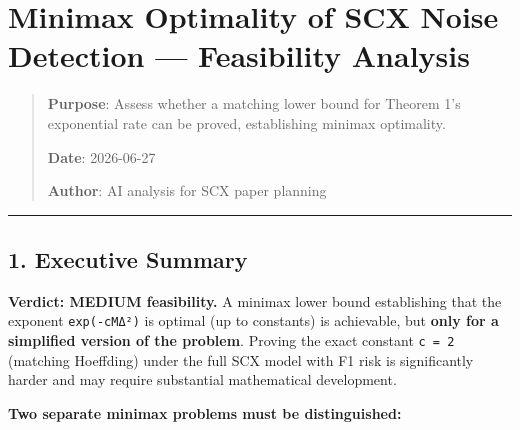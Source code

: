 \documentclass[
  12pt,
]{article}
\author{SCX}
\date{2026}
\begin{document}
\section{Minimax Optimality of SCX Noise Detection --- Feasibility
Analysis}\label{minimax-optimality-of-scx-noise-detection-feasibility-analysis}

\begin{quote}
\textbf{Purpose}: Assess whether a matching lower bound for Theorem 1's
exponential rate can be proved, establishing minimax optimality.

\textbf{Date}: 2026-06-27

\textbf{Author}: AI analysis for SCX paper planning
\end{quote}

\begin{center}\rule{0.5\linewidth}{0.5pt}\end{center}

\subsection{1. Executive Summary}\label{executive-summary}

\textbf{Verdict: MEDIUM feasibility.} A minimax lower bound establishing
that the exponent \texttt{exp(-cMΔ²)} is optimal (up to constants) is
achievable, but \textbf{only for a simplified version of the problem}.
Proving the exact constant \texttt{c\ =\ 2} (matching Hoeffding) under
the full SCX model with F1 risk is significantly harder and may require
substantial mathematical development.

\textbf{Two separate minimax problems must be distinguished:}
\end{document}
